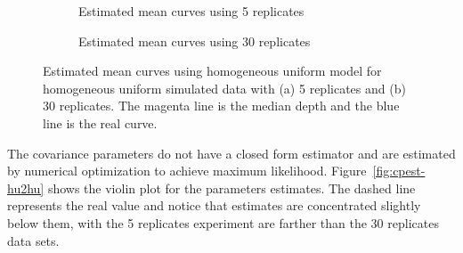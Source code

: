 \begin{figure}[!t]
  \begin{subfigure}{\textwidth}
    \centering
\begin{knitrout}
\color{fgcolor}\begin{kframe}


{\ttfamily\noindent\bfseries{}}

{\ttfamily\noindent\bfseries{}}

{\ttfamily\noindent\bfseries\color{errorcolor}{\#\# Error in eval(expr, envir, enclos): object 'hu2hu5' not found}}\end{kframe}
\end{knitrout}
    \caption{Estimated mean curves using 5 replicates}
  \end{subfigure}
    \begin{subfigure}{\textwidth}
      \centering
\begin{knitrout}
\color{fgcolor}\begin{kframe}


{\ttfamily\noindent\bfseries{}}

{\ttfamily\noindent\bfseries{}}

{\ttfamily\noindent\bfseries\color{errorcolor}{\#\# Error in eval(expr, envir, enclos): object 'hu2hu30' not found}}\end{kframe}
\end{knitrout}
    \caption{Estimated mean curves using 30 replicates}
  \end{subfigure}
  \caption[Mean curve estimation using homogeneous uniform model for homogeneous uniform simulated data]{Estimated mean curves using homogeneous uniform model for homogeneous uniform simulated data with (a) 5 replicates and (b) 30 replicates. The magenta line is the median depth and the blue line is the real curve.}
  \label{fig:mpchu2hu}
\end{figure}

The covariance parameters do not have a closed form estimator and are estimated by numerical optimization to achieve maximum likelihood. Figure~\ref{fig:cpest-hu2hu} shows the violin plot for the parameters estimates. The dashed line represents the real value and notice that estimates are concentrated slightly below them, with the 5 replicates experiment are farther than the 30 replicates data sets.




